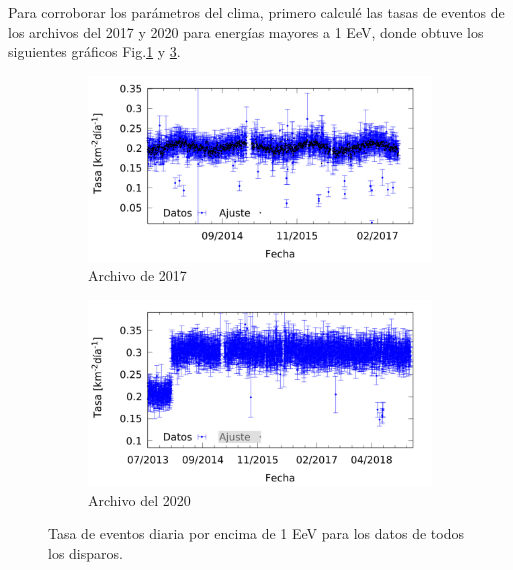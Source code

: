 			Para corroborar los parámetros del clima, primero calculé las tasas de eventos de los archivos del 2017 y 2020 para energías mayores a 1  EeV, donde obtuve los siguientes gráficos Fig.\ref{fig:rate_daily_2017_1EeV} y \ref{fig:rate_daily_2020_1EeV}. 

				\begin{figure}[H]
				
					\begin{subfigure}[b]{0.5\textwidth}
					\centering
					\includegraphics[width=\textwidth]{../Anisotropia/daily_rate/daily_rate_AllTriggers_2017_1EeV.png}
					\caption{Archivo de 2017} 	\label{fig:rate_daily_2017_1EeV}
					\end{subfigure}%
				\hfill
					\begin{subfigure}[b]{0.5\textwidth}
					\centering
					\includegraphics[width=\textwidth]{../Anisotropia/daily_rate/daily_rate_AllTriggers_2019_1EeV.png}
					\caption{Archivo del 2020} 	\label{fig:rate_daily_2020_1EeV}
					\end{subfigure}
					\caption{Tasa de eventos diaria por encima de 1 EeV para los datos de todos los disparos.}
				\end{figure}

